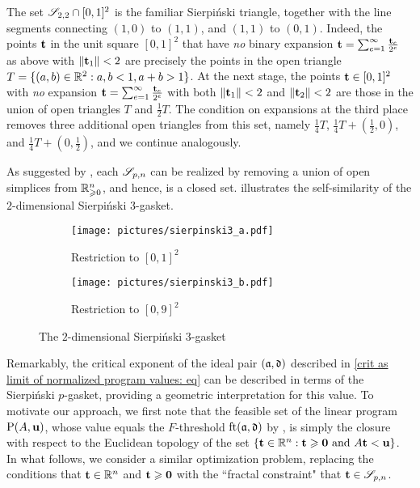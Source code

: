 \documentclass{amsart}
\begin{document}
\begin{example}
   \label{sierpinski triangle: E}
   The set $\mathscr{S}_{2,2} \cap [0,1]^2$ is the familiar Sierpi\'nski triangle, together with the line segments connecting $(1,0)$ to $(1,1)$, and $(1,1)$ to $(0,1)$.
   Indeed, the points $\mathbf{t}$ in the unit square $[0,1]^2$ that have \emph{no} binary expansion $\mathbf{t} = \sum_{e=1}^{\infty}\frac{\mathbf{t}_e}{2^e}$ as above with $\| \mathbf{t}_1 \| < 2$ are precisely the points in the open triangle  $T = \{ (a,b) \in \mathbb{R}^2 : a,b < 1, a+b > 1 \}$.
   At the next stage, the points $\mathbf{t} \in [0,1]^2$ with \emph{no} expansion $\mathbf{t} = \sum_{e=1}^{\infty}\frac{\mathbf{t}_e}{2^e}$ with both  $\| \mathbf{t}_1 \| < 2$ and $\| \mathbf{t}_2 \| < 2$ are those in the union of open triangles $T$ and $\frac{1}{2} T$.
   The condition on expansions at the third place removes three additional open triangles from this set, namely $\frac14 T$, $\frac14 T + (\frac12,0)$, and $\frac14 T + (0,\frac12)$, and we continue analogously.
\end{example}

As suggested by , each $\mathscr{S}_{p,n}$  can be realized by removing a union of open simplices from $\mathbb{R}_{\geqslant 0}^n$, and hence, is a closed set.
 illustrates the self-similarity of the $2$-dimensional Sierpi\'nski $3$-gasket.

\begin{figure}
\begin{subfigure}{.49\textwidth}
  \centering
  \texttt{[image: pictures/sierpinski3\_a.pdf]}
  \caption{Restriction to $[0,1]^2$}
\end{subfigure}
\begin{subfigure}{.49\textwidth}
  \centering
  \texttt{[image: pictures/sierpinski3\_b.pdf]}
  \caption{Restriction to $[0,9]^2$}
\end{subfigure}
\caption{The $2$-dimensional Sierpi\'nski 3-gasket}
\label{fig: sierpinski 3-gasket}
\end{figure}

Remarkably, the critical exponent of the ideal pair $(\mathfrak{a}, \mathfrak{d})$ described in \eqref{crit as limit of normalized program values: eq} can be described in terms of the Sierpi\'nski $p$-gasket, providing a geometric interpretation for this value.
To motivate our approach, we first note that the feasible set of the linear program $\mathrm{P}(A, \mathbf{u})$, whose value equals the $F$-threshold $\operatorname{ft}(\mathfrak{a}, \mathfrak{d})$ by , is simply the closure with respect to the Euclidean topology of the set $\{ \mathbf{t} \in \mathbb{R}^n : \mathbf{t} \geqslant \mathbf{0} \text{ and } A\mathbf{t} < \mathbf{u} \}$.
In what follows, we consider a similar optimization problem,  replacing the conditions that $\mathbf{t} \in \mathbb{R}^n$ and $\mathbf{t} \geqslant \mathbf{0}$ with the ``fractal constraint" that $\mathbf{t} \in \mathscr{S}_{p,n}$.
\end{document}
